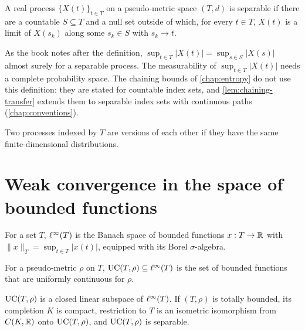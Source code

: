 \begin{definition}
  \label{def:han-2-5}
  A real process $\{X(t)\}_{t\in T}$ on a pseudo-metric space $(T,d)$ is separable if there are a countable $S\subseteq T$ and a null set outside of which, for every $t\in T$, $X(t)$ is a limit of $X(s_k)$ along some $s_k\in S$ with $s_k\to t$.
\end{definition}
\begin{remark}
  As the book notes after the definition, $\sup_{t\in T}|X(t)|=\sup_{s\in S}|X(s)|$ almost surely for a separable process.
  The measurability of $\sup_{t\in T}|X(t)|$ needs a complete probability space. The chaining bounds of \cref{chap:entropy} do not use this definition: they are stated for countable index sets, and \cref{lem:chaining-transfer} extends them to separable index sets with continuous paths (\cref{chap:conventions}).
\end{remark}

\begin{definition}
  \label{def:han-2-6}
  Two processes indexed by $T$ are versions of each other if they have the same finite-dimensional distributions.
\end{definition}

\section{Weak convergence in the space of bounded functions}

\begin{definition}
  \label{def:linf}
  For a set $T$, $\ell^\infty(T)$ is the Banach space of bounded functions $x:T\to\mathbb{R}$ with $\|x\|_T=\sup_{t\in T}|x(t)|$, equipped with its Borel $\sigma$-algebra.
\end{definition}

\begin{definition}[$\UC(T,\rho)$]
  \label{def:uc}
  For a pseudo-metric $\rho$ on $T$, $\mathrm{UC}(T,\rho)\subseteq\ell^\infty(T)$ is the set of bounded functions that are uniformly continuous for $\rho$.
\end{definition}

\begin{lemma}
  \label{lem:uc-structure}
  $\UC(T,\rho)$ is a closed linear subspace of $\ell^\infty(T)$. If $(T,\rho)$ is totally bounded, its completion $K$ is compact, restriction to $T$ is an isometric isomorphism from $C(K,\mathbb{R})$ onto $\UC(T,\rho)$, and $\UC(T,\rho)$ is separable.
\end{lemma}

